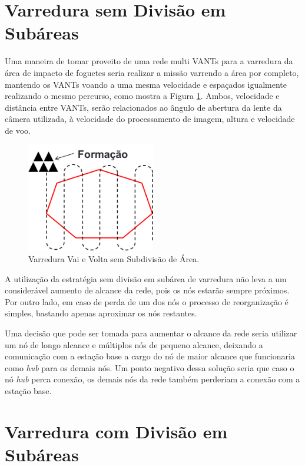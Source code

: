 \section{Varredura sem Divisão em Subáreas}

Uma maneira de tomar proveito de uma rede multi VANTs para a varredura da área de impacto de foguetes seria realizar a missão varrendo a área por completo, mantendo os VANTs voando a uma mesma velocidade e espaçados igualmente realizando o mesmo percurso, como mostra a Figura \ref{fig:semsubdivisao}. Ambos, velocidade e distância entre VANTs, serão relacionados ao ângulo de abertura da lente da câmera utilizada, à velocidade do processamento de imagem, altura e velocidade de voo.

\begin{figure} 
\center
\includegraphics[width=0.5\textwidth]{semsubdivisao.png}
\caption{Varredura Vai e Volta sem Subdivisão de Área.} 
\label{fig:semsubdivisao}
\end{figure}

A utilização da estratégia sem divisão em subárea de varredura não leva a um considerável aumento de alcance da rede, pois os nós estarão sempre próximos. Por outro lado, em caso de perda de um dos nós o processo de reorganização é simples, bastando apenas aproximar os nós restantes. 

Uma decisão que pode ser tomada para aumentar o alcance da rede seria utilizar um nó de longo alcance e múltiplos nós de pequeno alcance, deixando a comunicação com a estação base a cargo do nó de maior alcance que funcionaria como \emph{hub} para os demais nós. Um ponto negativo dessa solução seria que caso o nó \emph{hub} perca conexão, os demais nós da rede também perderiam a conexão com a estação base. 

\section{Varredura com Divisão em Subáreas}

